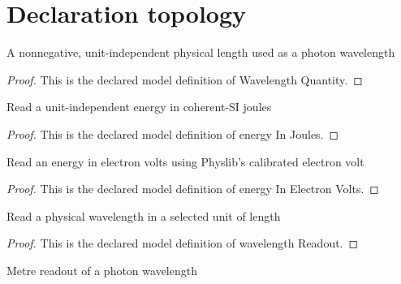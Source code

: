 \section{Declaration topology}
\begin{definition}
  \label{def:physics:phyx-mini-0637:phyxminiproblems-problemphyxmini0637-wavelengthquantity}
  A nonnegative, unit-independent physical length used as a photon wavelength
\end{definition}
\begin{proof}
  This is the declared model definition of Wavelength Quantity.
\end{proof}
\begin{definition}
  \label{def:physics:phyx-mini-0637:phyxminiproblems-problemphyxmini0637-energyinjoules}
  Read a unit-independent energy in coherent-SI joules
\end{definition}
\begin{proof}
  This is the declared model definition of energy In Joules.
\end{proof}
\begin{definition}
  \label{def:physics:phyx-mini-0637:phyxminiproblems-problemphyxmini0637-energyinelectronvolts}
  Read an energy in electron volts using Physlib's calibrated electron volt
\end{definition}
\begin{proof}
  This is the declared model definition of energy In Electron Volts.
\end{proof}
\begin{definition}
  \label{def:physics:phyx-mini-0637:phyxminiproblems-problemphyxmini0637-wavelengthreadout}
  Read a physical wavelength in a selected unit of length
\end{definition}
\begin{proof}
  This is the declared model definition of wavelength Readout.
\end{proof}
\begin{definition}
  \label{def:physics:phyx-mini-0637:phyxminiproblems-problemphyxmini0637-wavelengthinmeters}
  Metre readout of a photon wavelength
\end{definition}
